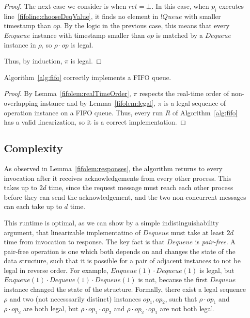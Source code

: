 \documentclass[a4paper,anonymous,USenglish]{lipics-v2021} %
\theoremstyle{definition}
\begin{document}
\begin{proof}
  The next case we consider is when $ret = \bot$.  In this case, when $p_i$ executes line~\ref{fifoline:chooseDeqValue}, it finds no element in $lQueue$ with smaller timestamp than $op$.  By the logic in the previous case, this means that every $Enqueue$ instance with timestamp smaller than $op$ is matched by a $Dequeue$ instance in $\rho$, so $\rho \cdot op$ is legal.

  Thus, by induction, $\pi$ is legal.
\end{proof}


\begin{theorem}
  Algorithm~\ref{alg:fifo} correctly implements a FIFO queue.
\end{theorem}

\begin{proof}
  By Lemma~\ref{fifolem:realTimeOrder}, $\pi$ respects the real-time order of non-overlapping instance and by Lemma~\ref{fifolem:legal}, $\pi$ is a legal sequence of operation instance on a FIFO queue.  Thus, every run $R$ of Algorithm~\ref{alg:fifo} has a valid linearization, so it is a correct implementation.
\end{proof}
 

\subsection{Complexity}

As observed in Lemma~\ref{fifolem:responses}, the algorithm returns to every invocation after it receives acknowledgements from every other process.  This takes up to $2d$ time, since the request message must reach each other process before they can send the acknowledgement, and the two non-concurrent messages can each take up to $d$ time.

This runtime is optimal, as we can show by a simple indistinguishability argument, that linearizable implementatino of $Dequeue$ must take at least $2d$ time from invocation to response.  The key fact is that $Dequeue$ is \emph{pair-free}.  A pair-free operation \cite{WangTalmageLeeWelch18} is one which both depends on and changes the state of the data structure, such that it is possible for a pair of adjacent instances to not be legal in reverse order.  For example, $Enqueue(1) \cdot Dequeue(1)$ is legal, but $Enqueue(1) \cdot Dequeue(1) \cdot Dequeue(1)$ is not, because the first $Dequeue$ instance changed the state of the structure.  Formally, there exist a legal sequence $\rho$ and two (not necesssarily distinct) instances $op_1, op_2$, such that $\rho \cdot op_1$ and $\rho \cdot op_2$ are both legal, but $\rho \cdot op_1 \cdot op_2$ and $\rho \cdot op_2 \cdot op_1$ are not both legal.
\end{document}
